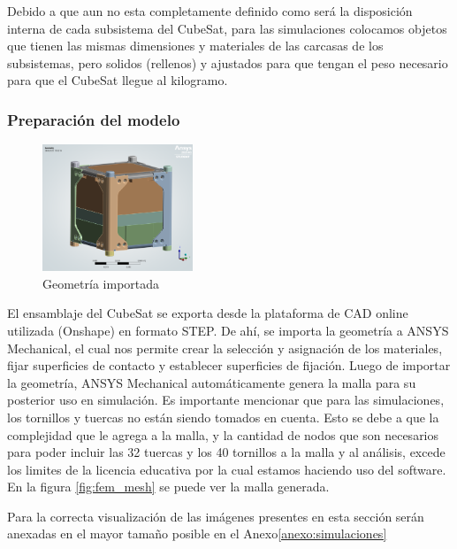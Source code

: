     Debido a que aun no esta completamente definido como será la disposición interna de cada subsistema del CubeSat,
    para las simulaciones colocamos objetos que tienen las mismas dimensiones y materiales de las carcasas de los
    subsistemas, pero solidos (rellenos) y ajustados para que tengan el peso necesario para que el CubeSat llegue al
    kilogramo.

    \subsubsection{Preparación del modelo}
      \begin{figure}
        \vspace{-0.5cm}
        \centering
        \includegraphics[width=0.4\textwidth]{image/fem/ansys_cubesat-geometry.png}
        \caption{Geometría importada}
        \label{fig:fem_geo}
      \end{figure}
      \hspace*{2em}
      El ensamblaje del CubeSat se exporta desde la plataforma de CAD online utilizada (Onshape) en formato STEP. De
      ahí, se importa la geometría a ANSYS Mechanical, el cual nos permite crear la selección y asignación de los
      materiales, fijar superficies de contacto y establecer superficies de fijación. Luego de importar la geometría,
      ANSYS Mechanical automáticamente genera la malla para su posterior uso en simulación.  Es importante mencionar que
      para las simulaciones, los tornillos y tuercas no están siendo tomados en cuenta. Esto se debe a que la
      complejidad que le agrega a la malla, y la cantidad de nodos que son necesarios para poder incluir las 32 tuercas
      y los 40 tornillos a la malla y al análisis, excede los limites de la licencia educativa por la cual estamos
      haciendo uso del software. En la figura \ref{fig:fem_mesh} se puede ver la malla generada.

      Para la correcta visualización de las imágenes presentes en esta sección serán anexadas en el mayor tamaño posible
      en el Anexo\ref{anexo:simulaciones}

